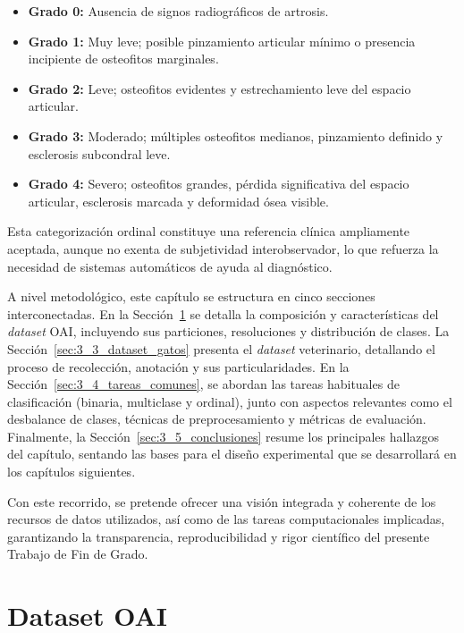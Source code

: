 \documentclass[11pt,spanish,listoffigures,listoftables]{tfgetsinf}
\begin{document}
\begin{itemize}
	\item \textbf{Grado 0:} Ausencia de signos radiográficos de artrosis.
	\item \textbf{Grado 1:} Muy leve; posible pinzamiento articular mínimo o presencia incipiente de osteofitos marginales.
	\item \textbf{Grado 2:} Leve; osteofitos evidentes y estrechamiento leve del espacio articular.
	\item \textbf{Grado 3:} Moderado; múltiples osteofitos medianos, pinzamiento definido y esclerosis subcondral leve.
	\item \textbf{Grado 4:} Severo; osteofitos grandes, pérdida significativa del espacio articular, esclerosis marcada y deformidad ósea visible.
\end{itemize}

Esta categorización ordinal constituye una referencia clínica ampliamente
aceptada, aunque no exenta de subjetividad interobservador, lo que refuerza la
necesidad de sistemas automáticos de ayuda al diagnóstico.

A nivel metodológico, este capítulo se estructura en cinco secciones
interconectadas. En la Sección~\ref{sec:3_2_dataset_oai} se detalla la
composición y características del \textit{dataset} OAI, incluyendo sus
particiones, resoluciones y distribución de clases. La
Sección~\ref{sec:3_3_dataset_gatos} presenta el \textit{dataset} veterinario,
detallando el proceso de recolección, anotación y sus particularidades. En la
Sección~\ref{sec:3_4_tareas_comunes}, se abordan las tareas habituales de
clasificación (binaria, multiclase y ordinal), junto con aspectos relevantes
como el desbalance de clases, técnicas de preprocesamiento y métricas de
evaluación. Finalmente, la Sección~\ref{sec:3_5_conclusiones} resume los
principales hallazgos del capítulo, sentando las bases para el diseño
experimental que se desarrollará en los capítulos siguientes.

Con este recorrido, se pretende ofrecer una visión integrada y coherente de los
recursos de datos utilizados, así como de las tareas computacionales
implicadas, garantizando la transparencia, reproducibilidad y rigor científico
del presente Trabajo de Fin de Grado.

\section{Dataset OAI}
\label{sec:3_2_dataset_oai}
\end{document}
